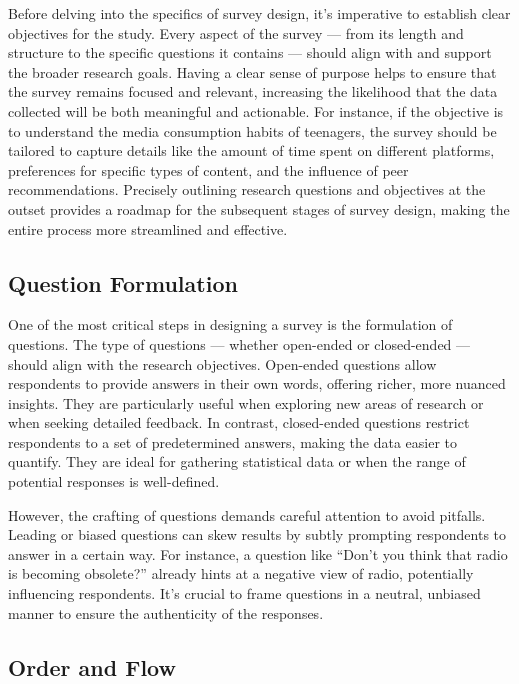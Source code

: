 \documentclass[
  b5paper]{book}
\begin{document}
Before delving into the specifics of survey design, it's imperative to establish clear objectives for the study. Every aspect of the survey --- from its length and structure to the specific questions it contains --- should align with and support the broader research goals. Having a clear sense of purpose helps to ensure that the survey remains focused and relevant, increasing the likelihood that the data collected will be both meaningful and actionable. For instance, if the objective is to understand the media consumption habits of teenagers, the survey should be tailored to capture details like the amount of time spent on different platforms, preferences for specific types of content, and the influence of peer recommendations. Precisely outlining research questions and objectives at the outset provides a roadmap for the subsequent stages of survey design, making the entire process more streamlined and effective.

\hypertarget{question-formulation}{%
\subsection*{Question Formulation}\label{question-formulation}}

One of the most critical steps in designing a survey is the formulation of questions. The type of questions --- whether open-ended or closed-ended --- should align with the research objectives. Open-ended questions allow respondents to provide answers in their own words, offering richer, more nuanced insights. They are particularly useful when exploring new areas of research or when seeking detailed feedback. In contrast, closed-ended questions restrict respondents to a set of predetermined answers, making the data easier to quantify. They are ideal for gathering statistical data or when the range of potential responses is well-defined.

However, the crafting of questions demands careful attention to avoid pitfalls. Leading or biased questions can skew results by subtly prompting respondents to answer in a certain way. For instance, a question like ``Don't you think that radio is becoming obsolete?'' already hints at a negative view of radio, potentially influencing respondents. It's crucial to frame questions in a neutral, unbiased manner to ensure the authenticity of the responses.

\hypertarget{order-and-flow}{%
\subsection*{Order and Flow}\label{order-and-flow}}
\end{document}
